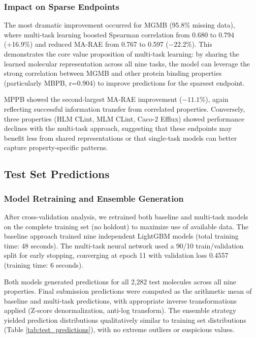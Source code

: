 \documentclass[11pt,a4paper]{article}
\begin{document}
\subsubsection{Impact on Sparse Endpoints}

The most dramatic improvement occurred for MGMB (95.8\% missing data), where multi-task learning boosted Spearman correlation from 0.680 to 0.794 (+16.9\%) and reduced MA-RAE from 0.767 to 0.597 ($-22.2\%$). This demonstrates the core value proposition of multi-task learning: by sharing the learned molecular representation across all nine tasks, the model can leverage the strong correlation between MGMB and other protein binding properties (particularly MBPB, r=0.904) to improve predictions for the sparsest endpoint.

MPPB showed the second-largest MA-RAE improvement ($-11.1\%$), again reflecting successful information transfer from correlated properties. Conversely, three properties (HLM CLint, MLM CLint, Caco-2 Efflux) showed performance declines with the multi-task approach, suggesting that these endpoints may benefit less from shared representations or that single-task models can better capture property-specific patterns.

\subsection{Test Set Predictions}

\subsubsection{Model Retraining and Ensemble Generation}

After cross-validation analysis, we retrained both baseline and multi-task models on the complete training set (no holdout) to maximize use of available data. The baseline approach trained nine independent LightGBM models (total training time: 48 seconds). The multi-task neural network used a 90/10 train/validation split for early stopping, converging at epoch 11 with validation loss 0.4557 (training time: 6 seconds).

Both models generated predictions for all 2,282 test molecules across all nine properties. Final submission predictions were computed as the arithmetic mean of baseline and multi-task predictions, with appropriate inverse transformations applied (Z-score denormalization, anti-log transform). The ensemble strategy yielded prediction distributions qualitatively similar to training set distributions (Table \ref{tab:test_predictions}), with no extreme outliers or suspicious values.
\end{document}

